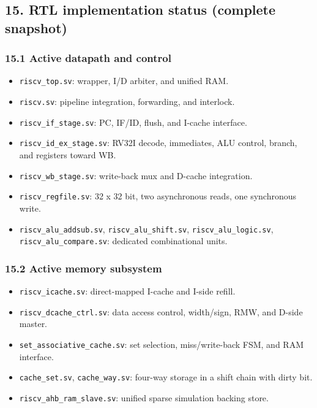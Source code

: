 \documentclass[]{article}
\providecommand{\tightlist}{%
  \setlength{\itemsep}{0pt}\setlength{\parskip}{0pt}}
\begin{document}
\hypertarget{15-rtl-implementation-status-complete-snapshot}{%
\subsection{15. RTL implementation status (complete
snapshot)}\label{15-rtl-implementation-status-complete-snapshot}}

\hypertarget{151-active-datapath-and-control}{%
\subsubsection{15.1 Active datapath and
control}\label{151-active-datapath-and-control}}

\begin{itemize}
\tightlist
\item
  \texttt{riscv\_top.sv}: wrapper, I/D arbiter, and unified RAM.
\item
  \texttt{riscv.sv}: pipeline integration, forwarding, and interlock.
\item
  \texttt{riscv\_if\_stage.sv}: PC, IF/ID, flush, and I-cache interface.
\item
  \texttt{riscv\_id\_ex\_stage.sv}: RV32I decode, immediates, ALU
  control, branch, and registers toward WB.
\item
  \texttt{riscv\_wb\_stage.sv}: write-back mux and D-cache integration.
\item
  \texttt{riscv\_regfile.sv}: 32 x 32 bit, two asynchronous reads, one
  synchronous write.
\item
  \texttt{riscv\_alu\_addsub.sv}, \texttt{riscv\_alu\_shift.sv},
  \texttt{riscv\_alu\_logic.sv}, \texttt{riscv\_alu\_compare.sv}:
  dedicated combinational units.
\end{itemize}

\hypertarget{152-active-memory-subsystem}{%
\subsubsection{15.2 Active memory
subsystem}\label{152-active-memory-subsystem}}

\begin{itemize}
\tightlist
\item
  \texttt{riscv\_icache.sv}: direct-mapped I-cache and I-side refill.
\item
  \texttt{riscv\_dcache\_ctrl.sv}: data access control, width/sign, RMW,
  and D-side master.
\item
  \texttt{set\_associative\_cache.sv}: set selection, miss/write-back
  FSM, and RAM interface.
\item
  \texttt{cache\_set.sv}, \texttt{cache\_way.sv}: four-way storage in a
  shift chain with dirty bit.
\item
  \texttt{riscv\_ahb\_ram\_slave.sv}: unified sparse simulation backing
  store.
\end{itemize}
\end{document}
